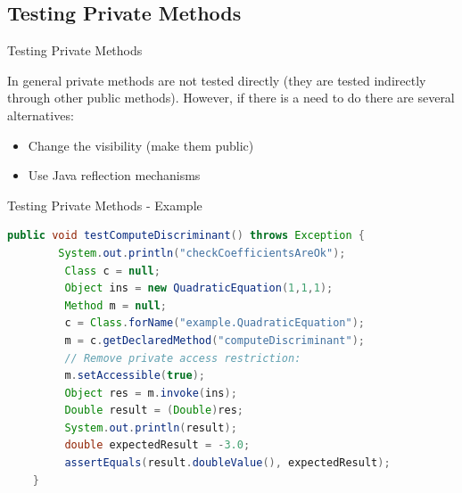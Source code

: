 \documentclass[11pt, xcolor=svgnames]{beamer}
\begin{document}

\subsection{Testing Private Methods}


\begin{frame}{Testing Private Methods}

In general private methods are not tested directly (they are tested indirectly through other public methods). However, if there is a need to do there are several alternatives:

\begin{itemize}
 \item Change the visibility (make them public)
 \item Use Java reflection mechanisms
\end{itemize}


\end{frame}


\begin{frame}[fragile]{Testing Private Methods - Example}

\begin{lstlisting}[language=Java,basicstyle=\tiny]
    public void testComputeDiscriminant() throws Exception {
        System.out.println("checkCoefficientsAreOk");
         Class c = null;
         Object ins = new QuadraticEquation(1,1,1);
         Method m = null;
         c = Class.forName("example.QuadraticEquation");
         m = c.getDeclaredMethod("computeDiscriminant");
         // Remove private access restriction:
         m.setAccessible(true);
         Object res = m.invoke(ins);
         Double result = (Double)res;
         System.out.println(result);
         double expectedResult = -3.0;
         assertEquals(result.doubleValue(), expectedResult);
    }
\end{lstlisting}

\end{frame}

\end{document}
